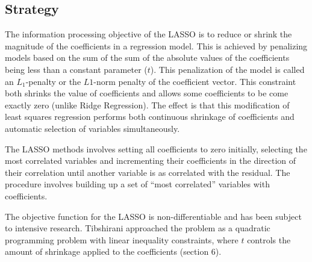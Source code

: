 \subsection{Strategy}
The information processing objective of the LASSO is to reduce or shrink the magnitude of the coefficients in a regression model.
This is achieved by penalizing models based on the sum of the sum of the absolute values of the coefficients being less than a constant parameter ($t$). This penalization of the model is called an $L_1$-penalty or the $L1$-norm penalty of the coefficient vector. This constraint both shrinks the value of coefficients and allows some coefficients to be come exactly zero (unlike Ridge Regression). The effect is that this modification of least squares regression performs both continuous shrinkage of coefficients and automatic selection of variables simultaneously. 

The LASSO methods involves setting all coefficients to zero initially, selecting the most correlated variables and incrementing their coefficients in the direction of their correlation until another variable is as correlated with the residual. The procedure involves building up a set of ``most correlated'' variables with coefficients.

The objective function for the LASSO is non-differentiable and has been subject to intensive research. Tibshirani approached the problem as a quadratic programming problem with linear inequality constraints, where $t$ controls the amount of shrinkage applied to the coefficients \cite{Tibshirani1996} (section 6).


